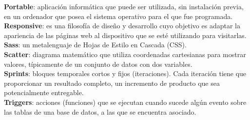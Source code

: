 \textbf{Portable}: aplicación informática que puede ser utilizada, sin instalación previa, en un ordenador que posea el sistema operativo para el que fue programada.\\

\textbf{Responsive}: es una filosofía de diseño y desarrollo cuyo objetivo es adaptar la apariencia de las páginas web al dispositivo que se esté utilizando para visitarlas.\\

\textbf{Sass}: un metalenguaje de Hojas de Estilo en Cascada (CSS).\\

\textbf{Scatter}: diagrama matemático que utiliza coordenadas cartesianas para mostrar valores, típicamente de un conjunto de datos con dos variables.\\

\textbf{Sprints}:  bloques temporales cortos y fijos (iteraciones). Cada iteración tiene que proporcionar un resultado completo, un incremento de producto que sea potencialmente entregable.\\

\textbf{Triggers}: acciones (funciones) que se ejecutan cuando sucede algún evento sobre las tablas de una base de datos, a las que se encuentra asociado.

\clearpage
